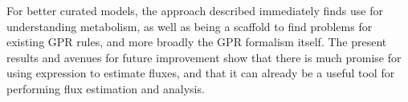 For better curated models, the approach described immediately finds
use for understanding metabolism, as well as being a scaffold to find
problems for existing GPR rules, and more broadly the GPR formalism itself.
The present results and avenues for future improvement
show that there is much promise for using expression to estimate
fluxes, and that it can already be a useful tool for performing flux
estimation and analysis.

